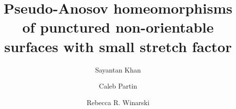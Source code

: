 \documentclass[11pt, notitlepage]{amsart}
\title{Pseudo-Anosov homeomorphisms of punctured non-orientable surfaces with small stretch factor}
\author{Sayantan Khan}
\author{Caleb Partin}
\author{Rebecca R. Winarski}
\theoremstyle{definition}
\theoremstyle{definition}
\theoremstyle{definition}
\theoremstyle{remark}
\theoremstyle{definition}
\begin{document}
\maketitle



\listoftodos





% 



\end{document}
